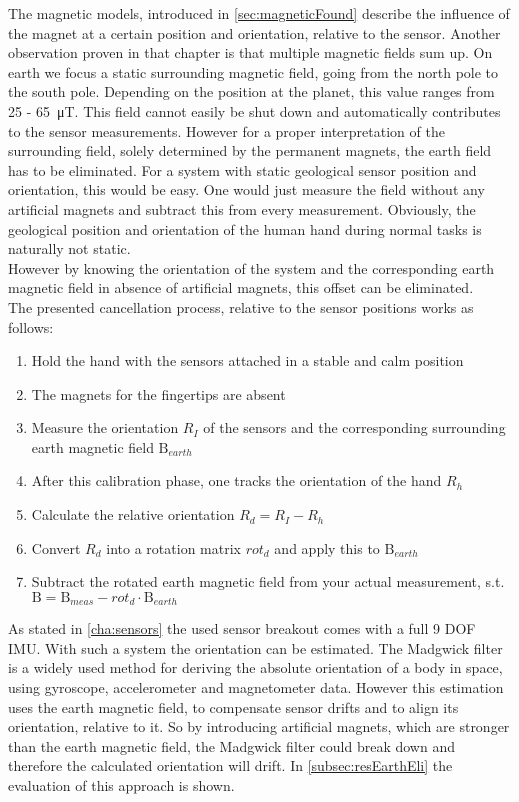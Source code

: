 The magnetic models, introduced in \ref{sec:magneticFound} describe the influence of the magnet at a certain position and orientation, relative to the sensor. Another observation proven in that chapter is that multiple magnetic fields sum up. On earth we focus a static surrounding magnetic field, going from the north pole to the south pole. Depending on the position at the planet, this value ranges from 25 - \SI{65}{\micro \tesla}. This field cannot easily be shut down and automatically contributes to the sensor measurements. However for a proper interpretation of the surrounding field, solely determined by the permanent magnets, the earth field has to be eliminated. For a system with static geological sensor position and orientation, this would be easy. One would just measure the field without any artificial magnets and subtract this from every measurement. Obviously, the geological position and orientation of the human hand during normal tasks is naturally not static.\\
However by knowing the orientation of the system and the corresponding earth magnetic field in absence of artificial magnets, this offset can be eliminated.\\
The presented cancellation process, relative to the sensor positions works as follows:\\
\begin{enumerate}
\item Hold the hand with the sensors attached in a stable and calm position
\item The magnets for the fingertips are absent
\item Measure the orientation $ R_{I} $ of the sensors and the corresponding surrounding earth magnetic field $ \mathrm{B}_{earth} $
\item After this calibration phase, one tracks the orientation of the hand $ R_{h} $
\item Calculate the relative orientation $ R_{d} = R_{I} - R_{h} $
\item Convert $ R_{d} $ into a rotation matrix $ rot_{d} $ and apply this to $ \mathrm{B}_{earth} $
\item Subtract the rotated earth magnetic field from your actual measurement, s.t. \\ $ \mathrm{B} = \mathrm{B}_{meas} - rot_{d} \cdot \mathrm{B}_{earth} $
\end{enumerate}
As stated in \ref{cha:sensors} the used sensor breakout comes with a full 9 \ac{DOF} \ac{IMU}. With such a system the orientation can be estimated. The Madgwick filter \cite{madgwick2010efficient} is a widely used method for deriving the absolute orientation of a body in space, using gyroscope, accelerometer and magnetometer data. However this estimation uses the earth magnetic field, to compensate sensor drifts and to align its orientation, relative to it. So by introducing artificial magnets, which are stronger than the earth magnetic field, the Madgwick filter could break down and therefore the calculated orientation will drift. In \ref{subsec:resEarthEli} the evaluation of this approach is shown. 




